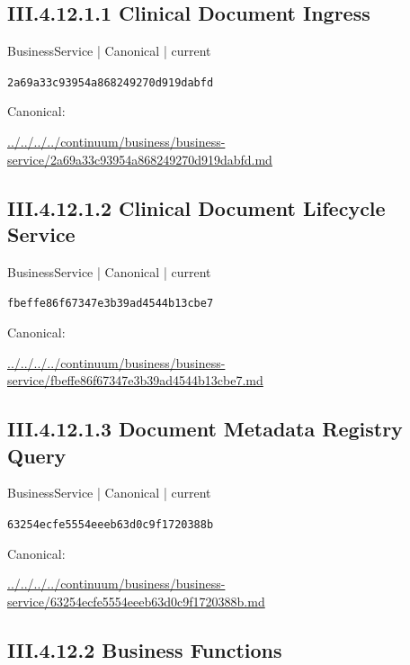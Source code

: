 \documentclass[10pt,a4paper]{article}
\begin{document}
\subsection*{III.4.12.1.1 Clinical Document Ingress}
{\small BusinessService | Canonical | current}\par
\texttt{2a69a33c93954a868249270d919dabfd}\par
Canonical: \par
{\footnotesize\url{../../../../continuum/business/business-service/2a69a33c93954a868249270d919dabfd.md}}\par
\subsection*{III.4.12.1.2 Clinical Document Lifecycle Service}
{\small BusinessService | Canonical | current}\par
\texttt{fbeffe86f67347e3b39ad4544b13cbe7}\par
Canonical: \par
{\footnotesize\url{../../../../continuum/business/business-service/fbeffe86f67347e3b39ad4544b13cbe7.md}}\par
\subsection*{III.4.12.1.3 Document Metadata Registry Query}
{\small BusinessService | Canonical | current}\par
\texttt{63254ecfe5554eeeb63d0c9f1720388b}\par
Canonical: \par
{\footnotesize\url{../../../../continuum/business/business-service/63254ecfe5554eeeb63d0c9f1720388b.md}}\par
\subsection*{III.4.12.2 Business Functions}
\end{document}

